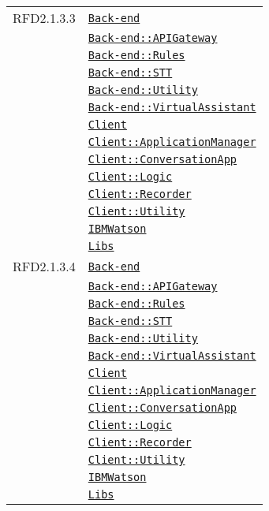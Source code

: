 \begin{longtable}{|>{\centering}m{3cm}|m{10cm}<{\centering}|}
RFD2.1.3.3 & \hyperref[Back-end]{\texttt{Back-end}}\\
& \hyperref[Back-end::APIGateway]{\texttt{Back-end::APIGateway}}\\
& \hyperref[Back-end::Rules]{\texttt{Back-end::Rules}}\\
& \hyperref[Back-end::STT]{\texttt{Back-end::STT}}\\
& \hyperref[Back-end::Utility]{\texttt{Back-end::Utility}}\\
& \hyperref[Back-end::VirtualAssistant]{\texttt{Back-end::VirtualAssistant}}\\
& \hyperref[Client]{\texttt{Client}}\\
& \hyperref[Client::ApplicationManager]{\texttt{Client::ApplicationManager}}\\
& \hyperref[Client::ConversationApp]{\texttt{Client::ConversationApp}}\\
& \hyperref[Client::Logic]{\texttt{Client::Logic}}\\
& \hyperref[Client::Recorder]{\texttt{Client::Recorder}}\\
& \hyperref[Client::Utility]{\texttt{Client::Utility}}\\
& \hyperref[IBMWatson]{\texttt{IBMWatson}}\\
& \hyperref[Libs]{\texttt{Libs}}\\ \hline

RFD2.1.3.4 & \hyperref[Back-end]{\texttt{Back-end}}\\
& \hyperref[Back-end::APIGateway]{\texttt{Back-end::APIGateway}}\\
& \hyperref[Back-end::Rules]{\texttt{Back-end::Rules}}\\
& \hyperref[Back-end::STT]{\texttt{Back-end::STT}}\\
& \hyperref[Back-end::Utility]{\texttt{Back-end::Utility}}\\
& \hyperref[Back-end::VirtualAssistant]{\texttt{Back-end::VirtualAssistant}}\\
& \hyperref[Client]{\texttt{Client}}\\
& \hyperref[Client::ApplicationManager]{\texttt{Client::ApplicationManager}}\\
& \hyperref[Client::ConversationApp]{\texttt{Client::ConversationApp}}\\
& \hyperref[Client::Logic]{\texttt{Client::Logic}}\\
& \hyperref[Client::Recorder]{\texttt{Client::Recorder}}\\
& \hyperref[Client::Utility]{\texttt{Client::Utility}}\\
& \hyperref[IBMWatson]{\texttt{IBMWatson}}\\
& \hyperref[Libs]{\texttt{Libs}}\\ \hline


\end{longtable}
